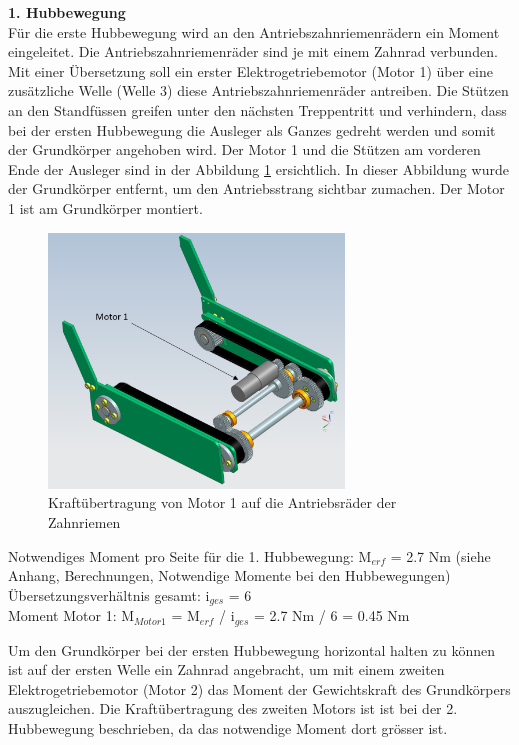 \textbf{1. Hubbewegung}\\
Für die erste Hubbewegung wird an den Antriebszahnriemenrädern ein Moment eingeleitet. Die Antriebszahnriemenräder sind je mit einem Zahnrad verbunden. Mit einer Übersetzung soll ein erster Elektrogetriebemotor (Motor 1) über eine zusätzliche Welle (Welle 3) diese Antriebszahnriemenräder antreiben. Die Stützen an den Standfüssen greifen unter den nächsten Treppentritt und verhindern, dass bei der ersten Hubbewegung die Ausleger als Ganzes gedreht werden und somit der Grundkörper angehoben wird. Der Motor 1 und die Stützen am vorderen Ende der Ausleger sind in der Abbildung \ref{fig:motor1-und-stützen} ersichtlich. In dieser Abbildung wurde der Grundkörper entfernt, um den Antriebsstrang sichtbar zumachen. Der Motor 1 ist am Grundkörper montiert.

\begin{figure}[H]
  \includegraphics[width=0.7\textwidth]{img/Treppensteigen/Motor 1 final.PNG}
  \centering
  \caption{Kraftübertragung von Motor 1 auf die Antriebsräder der Zahnriemen}
  \label{fig:motor1-und-stützen}
\end{figure}

Notwendiges Moment pro Seite für die 1. Hubbewegung: M$_{erf}$ = 2.7 Nm (siehe Anhang, Berechnungen, Notwendige Momente bei den Hubbewegungen)\\

Übersetzungsverhältnis gesamt: i$_{ges}$ = 6\\

Moment Motor 1: M$_{Motor 1}$ = M$_{erf}$ / i$_{ges}$ = 2.7 Nm / 6 = 0.45 Nm

\newpage

Um den Grundkörper bei der ersten Hubbewegung horizontal halten zu können ist auf der ersten Welle ein Zahnrad angebracht, um mit einem zweiten Elektrogetriebemotor (Motor 2) das Moment der Gewichtskraft des Grundkörpers auszugleichen. Die Kraftübertragung des zweiten Motors ist ist bei der 2. Hubbewegung beschrieben, da das notwendige Moment dort grösser ist.\\

